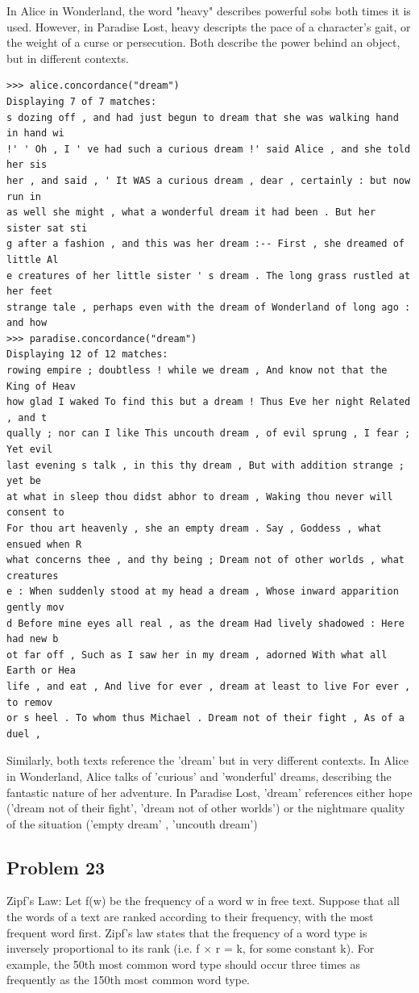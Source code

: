 \documentclass[12pt]{article}
\begin{document}
In Alice in Wonderland, the word "heavy" describes powerful sobs both times it is used. However, in Paradise Lost, heavy descripts the pace of a character's gait, or the weight of a curse or persecution. Both describe the power behind an object, but in different contexts.

\begin{lstlisting}
>>> alice.concordance("dream")
Displaying 7 of 7 matches:
s dozing off , and had just begun to dream that she was walking hand in hand wi
!' ' Oh , I ' ve had such a curious dream !' said Alice , and she told her sis
her , and said , ' It WAS a curious dream , dear , certainly : but now run in
as well she might , what a wonderful dream it had been . But her sister sat sti
g after a fashion , and this was her dream :-- First , she dreamed of little Al
e creatures of her little sister ' s dream . The long grass rustled at her feet
strange tale , perhaps even with the dream of Wonderland of long ago : and how
>>> paradise.concordance("dream")
Displaying 12 of 12 matches:
rowing empire ; doubtless ! while we dream , And know not that the King of Heav
how glad I waked To find this but a dream ! Thus Eve her night Related , and t
qually ; nor can I like This uncouth dream , of evil sprung , I fear ; Yet evil
last evening s talk , in this thy dream , But with addition strange ; yet be
at what in sleep thou didst abhor to dream , Waking thou never will consent to
For thou art heavenly , she an empty dream . Say , Goddess , what ensued when R
what concerns thee , and thy being ; Dream not of other worlds , what creatures
e : When suddenly stood at my head a dream , Whose inward apparition gently mov
d Before mine eyes all real , as the dream Had lively shadowed : Here had new b
ot far off , Such as I saw her in my dream , adorned With what all Earth or Hea
life , and eat , And live for ever , dream at least to live For ever , to remov
or s heel . To whom thus Michael . Dream not of their fight , As of a duel ,
\end{lstlisting}
	Similarly, both texts reference the 'dream' but in very different contexts. In Alice in Wonderland, Alice talks of 'curious' and 'wonderful' dreams, describing the fantastic nature of her adventure. In Paradise Lost, 'dream'  references either hope ('dream not of their fight', 'dream not of other worlds') or the nightmare quality of the situation ('empty dream' , 'uncouth dream')
	
	
\subsection*{Problem 23} Zipf's Law: Let f(w) be the frequency of a word w in free text. Suppose that all the words of a text are ranked according to their frequency, with the most frequent word first. Zipf's law states that the frequency of a word type is inversely proportional to its rank (i.e. f × r = k, for some constant k). For example, the 50th most common word type should occur three times as frequently as the 150th most common word type.
\end{document}

